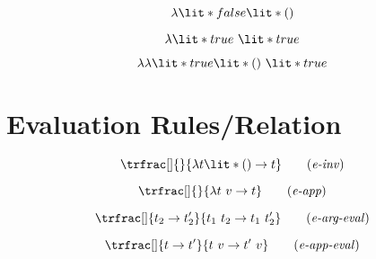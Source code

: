 \documentclass[11hpt]{article}
\newcommand{\ruletag}[1]{
  \tag{\emph{#1}}
}
\begin{document}
\begin{equation*}
\lambda \lit*{false}\lit*{()}
\end{equation*}

\begin{equation*}
\lambda \lit*{true}  \ \lit*{true}
\end{equation*}

\begin{equation*}
\lambda\lambda \lit*{true}  \lit*{()} \ \lit*{true}
\end{equation*}

\section{Evaluation Rules/Relation}

\begin{equation}
\trfrac[]{}{
  \lambda t \lit*{()} \rightarrow  t
} \ruletag{e-inv}
\end{equation}

\begin{equation}
\trfrac[]{}{
  \lambda t \ v  \rightarrow  t
} \ruletag{e-app}
\end{equation}

\begin{equation}
\trfrac[]{
  t_{2}  \rightarrow  t_{2}'
}{
  t_{1} \  t_{2}  \rightarrow t_{1} \  t_{2}'
} \ruletag{e-arg-eval}
\end{equation}

\begin{equation}
\trfrac[]{
   t \rightarrow  t'
}{
  t \ v \rightarrow t' \ v
} \ruletag{e-app-eval}
\end{equation}

\
\end{document}
